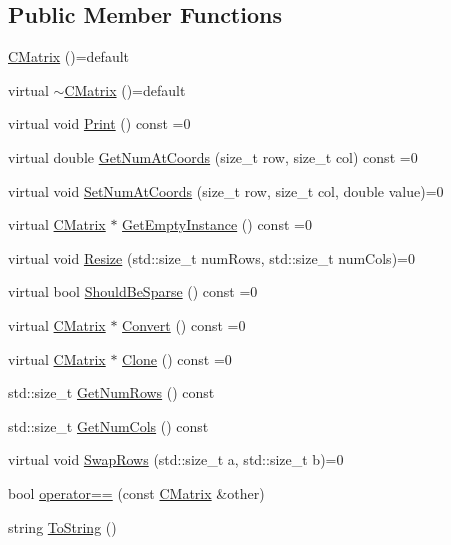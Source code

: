 \subsection*{Public Member Functions}
\begin{DoxyCompactItemize}
\item 
\hyperlink{classCMatrix_ab91da59b03ce55dc412bc69578ecc855}{C\+Matrix} ()=default
\item 
virtual \hyperlink{classCMatrix_a0c4bbe807ddb1122065db4c3e3d6f964}{$\sim$\+C\+Matrix} ()=default
\item 
virtual void \hyperlink{classCMatrix_a424a048d20918f0f041f4a8645823ae7}{Print} () const =0
\item 
virtual double \hyperlink{classCMatrix_afa0213e0a6c5823e6b6e786891cc5f2d}{Get\+Num\+At\+Coords} (size\+\_\+t row, size\+\_\+t col) const =0
\item 
virtual void \hyperlink{classCMatrix_afeba0f7cfcc2623bde41cf6111b0ef6a}{Set\+Num\+At\+Coords} (size\+\_\+t row, size\+\_\+t col, double value)=0
\item 
virtual \hyperlink{classCMatrix}{C\+Matrix} $\ast$ \hyperlink{classCMatrix_a7495208c2bd786fe46b130f6090e7eb5}{Get\+Empty\+Instance} () const =0
\item 
virtual void \hyperlink{classCMatrix_adb83eafeeea2025f9c84d172f1bb0f1e}{Resize} (std\+::size\+\_\+t num\+Rows, std\+::size\+\_\+t num\+Cols)=0
\item 
virtual bool \hyperlink{classCMatrix_a668eaab1f5d9b498e721464124f158c4}{Should\+Be\+Sparse} () const =0
\item 
virtual \hyperlink{classCMatrix}{C\+Matrix} $\ast$ \hyperlink{classCMatrix_aca808472e6465738fae14a6ac244cf0b}{Convert} () const =0
\item 
virtual \hyperlink{classCMatrix}{C\+Matrix} $\ast$ \hyperlink{classCMatrix_a42ac1f2a9e69919974febca17971be60}{Clone} () const =0
\item 
std\+::size\+\_\+t \hyperlink{classCMatrix_a7cd60ba1f5922e652610fd6efae849a8}{Get\+Num\+Rows} () const 
\item 
std\+::size\+\_\+t \hyperlink{classCMatrix_a265f204d3811546b84d2120af5cf8a52}{Get\+Num\+Cols} () const 
\item 
virtual void \hyperlink{classCMatrix_aa9f96d82fa2e564f89f35a1781a12d69}{Swap\+Rows} (std\+::size\+\_\+t a, std\+::size\+\_\+t b)=0
\item 
bool \hyperlink{classCMatrix_a2f26b64fa654512fe2a4e954f18e1f1c}{operator==} (const \hyperlink{classCMatrix}{C\+Matrix} \&other)
\item 
string \hyperlink{classCMatrix_ab9e2348aa0a043915901a39d5f89ea38}{To\+String} ()
\end{DoxyCompactItemize}

